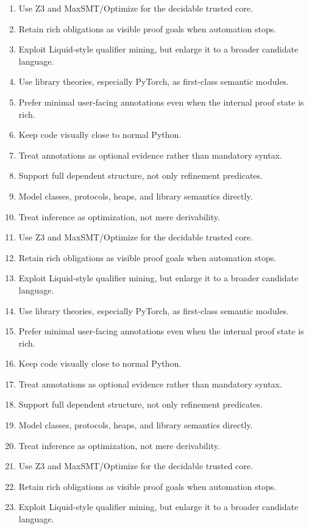 \documentclass[11pt]{article}
\newcommand{\Zthree}{\textsc{Z3}}
\theoremstyle{definition}
\theoremstyle{plain}
\begin{document}
\begin{enumerate}[label=\arabic*.]
  \item Use \Zthree{} and MaxSMT/Optimize for the decidable trusted core.
  \item Retain rich obligations as visible proof goals when automation stops.
  \item Exploit Liquid-style qualifier mining, but enlarge it to a broader candidate language.
  \item Use library theories, especially PyTorch, as first-class semantic modules.
  \item Prefer minimal user-facing annotations even when the internal proof state is rich.
  \item Keep code visually close to normal Python.
  \item Treat annotations as optional evidence rather than mandatory syntax.
  \item Support full dependent structure, not only refinement predicates.
  \item Model classes, protocols, heaps, and library semantics directly.
  \item Treat inference as optimization, not mere derivability.
  \item Use \Zthree{} and MaxSMT/Optimize for the decidable trusted core.
  \item Retain rich obligations as visible proof goals when automation stops.
  \item Exploit Liquid-style qualifier mining, but enlarge it to a broader candidate language.
  \item Use library theories, especially PyTorch, as first-class semantic modules.
  \item Prefer minimal user-facing annotations even when the internal proof state is rich.
  \item Keep code visually close to normal Python.
  \item Treat annotations as optional evidence rather than mandatory syntax.
  \item Support full dependent structure, not only refinement predicates.
  \item Model classes, protocols, heaps, and library semantics directly.
  \item Treat inference as optimization, not mere derivability.
  \item Use \Zthree{} and MaxSMT/Optimize for the decidable trusted core.
  \item Retain rich obligations as visible proof goals when automation stops.
  \item Exploit Liquid-style qualifier mining, but enlarge it to a broader candidate language.

\end{enumerate}
\end{document}
